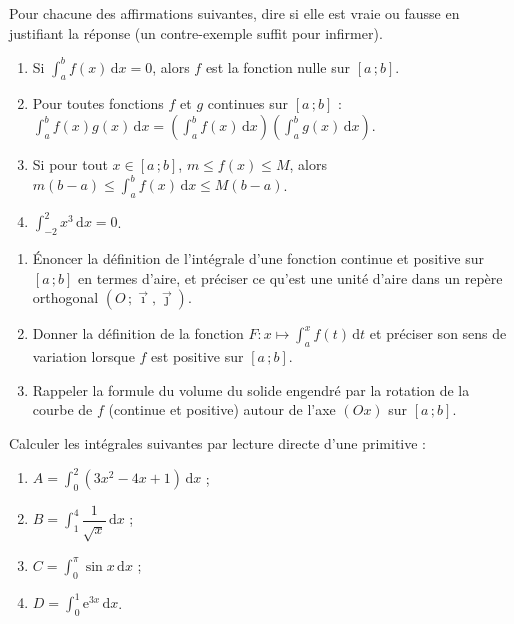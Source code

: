 \documentclass[11pt]{article}
\begin{document}
\begin{exercice}
Pour chacune des affirmations suivantes, dire si elle est vraie ou fausse en justifiant la réponse (un contre-exemple suffit pour infirmer).
\begin{enumerate}
\item Si $\displaystyle\int_a^b f(x)\,\mathrm{d}x = 0$, alors $f$ est la fonction nulle sur $[a\,;b]$.
\item Pour toutes fonctions $f$ et $g$ continues sur $[a\,;b]$ : $\displaystyle\int_a^b f(x)g(x)\,\mathrm{d}x = \left(\int_a^b f(x)\,\mathrm{d}x\right)\left(\int_a^b g(x)\,\mathrm{d}x\right)$.
\item Si pour tout $x\in[a\,;b]$, $m\le f(x)\le M$, alors $m(b-a)\le \displaystyle\int_a^b f(x)\,\mathrm{d}x \le M(b-a)$.
\item $\displaystyle\int_{-2}^{2} x^3\,\mathrm{d}x = 0$.
\end{enumerate}
\end{exercice}

\begin{exercice}
\begin{enumerate}
\item Énoncer la définition de l'intégrale d'une fonction continue et positive sur $[a\,;b]$ en termes d'aire, et préciser ce qu'est une unité d'aire dans un repère orthogonal $(O\,;\vec{\imath},\vec{\jmath})$.
\item Donner la définition de la fonction $F : x\longmapsto \displaystyle\int_a^x f(t)\,\mathrm{d}t$ et préciser son sens de variation lorsque $f$ est positive sur $[a\,;b]$.
\item Rappeler la formule du volume du solide engendré par la rotation de la courbe de $f$ (continue et positive) autour de l'axe $(Ox)$ sur $[a\,;b]$.
\end{enumerate}
\end{exercice}

\begin{exercice}
Calculer les intégrales suivantes par lecture directe d'une primitive :
\begin{enumerate}
\item $A=\displaystyle\int_0^2 (3x^2-4x+1)\,\mathrm{d}x$ ;
\item $B=\displaystyle\int_1^{4} \dfrac{1}{\sqrt{x}}\,\mathrm{d}x$ ;
\item $C=\displaystyle\int_0^{\pi} \sin x\,\mathrm{d}x$ ;
\item $D=\displaystyle\int_0^{1} \mathrm{e}^{3x}\,\mathrm{d}x$.
\end{enumerate}
\end{exercice}
\end{document}
